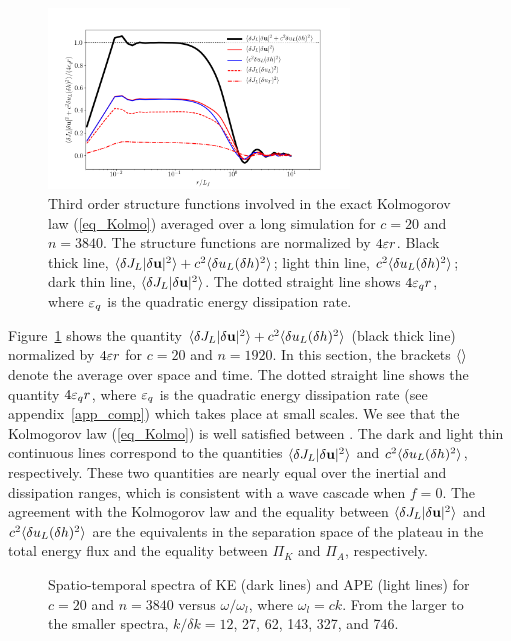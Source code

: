 \begin{figure}
\centerline{\includegraphics[width=3.15in]{../Pyfig/fig_Kolmo_c=20_N=3840}}
\caption{
Third order structure functions involved in the exact Kolmogorov law (\ref{eq_Kolmo}) 
averaged over a long simulation for $c = 20$ and $n = 3840$.
%
The structure functions are normalized by $4 \varepsilon r$.
%
Black thick line, $\langle  \delta J_L|\delta \textbf{u}|^2  \rangle 
+ c^2\langle \delta u_L(\delta h)^2 \rangle$;
light thin line, $c^2\langle \delta u_L (\delta h)^2 \rangle$;
dark thin line, $\langle \delta J_L |\delta \textbf{u}|^2 \rangle$.
%
The dotted straight line shows $4 \varepsilon_q r$, 
where $\varepsilon_q$ is the quadratic energy dissipation rate.
}
\label{fig_Kolmo}
\end{figure}


Figure~\ref{fig_Kolmo} shows the quantity $\langle \delta J_L|\delta
\textbf{u}|^2  \rangle + c^2\langle \delta u_L(\delta h)^2  \rangle$ (black thick line)
normalized by $4 \varepsilon r$ for $c = 20$ and $n = 1920$.
%
In this section, the brackets $\langle  \rangle$ denote the average over space
and time.
%
The dotted straight line shows the quantity $4 \varepsilon_q r$, where
$\varepsilon_q$ is the quadratic energy dissipation rate (see
appendix~\ref{app_comp}) which takes place at small scales.
%
We see that the Kolmogorov law (\ref{eq_Kolmo}) is well satisfied
between .  The dark and
light thin continuous lines correspond to the quantities $\langle \delta
J_L|\delta \textbf{u}|^2  \rangle$ and $c^2\langle \delta u_L(\delta h)^2 \rangle$,
respectively.
%
These two quantities are nearly equal over the inertial and
dissipation ranges, which is consistent with a wave cascade when
$f=0$.
%
The agreement with the Kolmogorov law and the equality between
$\langle \delta J_L|\delta \textbf{u}|^2  \rangle$ and $c^2\langle \delta u_L(\delta
h)^2 \rangle$ are the equivalents in the separation space of the plateau in
the total energy flux and the equality between $\Pi_K$ and $\Pi_A$,
respectively.




\begin{figure}
\caption{Spatio-temporal spectra of KE (dark lines) and APE (light
lines) for $c = 20$ and $n = 3840$ versus $\omega/\omega_l$, where
$\omega_l = c k$.  From the larger to the smaller spectra, $k/\delta k
= 12$, 27, 62, 143, 327, and 746.  }
\label{fig_spatiotemp_spectra}
\end{figure}

